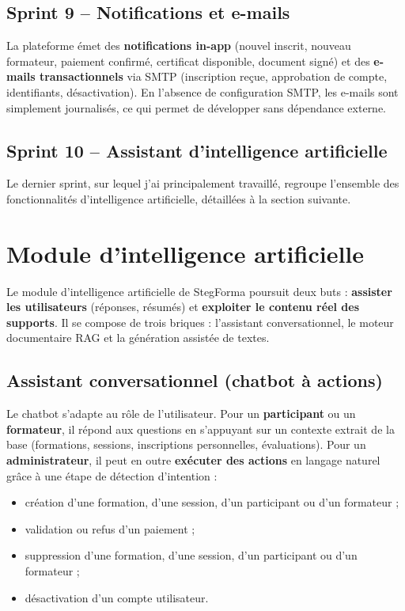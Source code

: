 \documentclass[12pt,a4paper,oneside,openany]{report}
\begin{document}
\subsection{Sprint 9 -- Notifications et e-mails}

La plateforme émet des \textbf{notifications in-app} (nouvel inscrit, nouveau formateur, paiement confirmé, certificat disponible, document signé) et des \textbf{e-mails transactionnels} via SMTP (inscription reçue, approbation de compte, identifiants, désactivation). En l'absence de configuration SMTP, les e-mails sont simplement journalisés, ce qui permet de développer sans dépendance externe.

\subsection{Sprint 10 -- Assistant d'intelligence artificielle}

Le dernier sprint, sur lequel j'ai principalement travaillé, regroupe l'ensemble des fonctionnalités d'intelligence artificielle, détaillées à la section suivante.

\section{Module d'intelligence artificielle}

Le module d'intelligence artificielle de StegForma poursuit deux buts : \textbf{assister les utilisateurs} (réponses, résumés) et \textbf{exploiter le contenu réel des supports}. Il se compose de trois briques : l'assistant conversationnel, le moteur documentaire RAG et la génération assistée de textes.

\subsection{Assistant conversationnel (chatbot à actions)}

Le chatbot s'adapte au rôle de l'utilisateur. Pour un \textbf{participant} ou un \textbf{formateur}, il répond aux questions en s'appuyant sur un contexte extrait de la base (formations, sessions, inscriptions personnelles, évaluations). Pour un \textbf{administrateur}, il peut en outre \textbf{exécuter des actions} en langage naturel grâce à une étape de détection d'intention :

\begin{itemize}
    \item création d'une formation, d'une session, d'un participant ou d'un formateur ;
    \item validation ou refus d'un paiement ;
    \item suppression d'une formation, d'une session, d'un participant ou d'un formateur ;
    \item désactivation d'un compte utilisateur.
\end{itemize}
\end{document}
